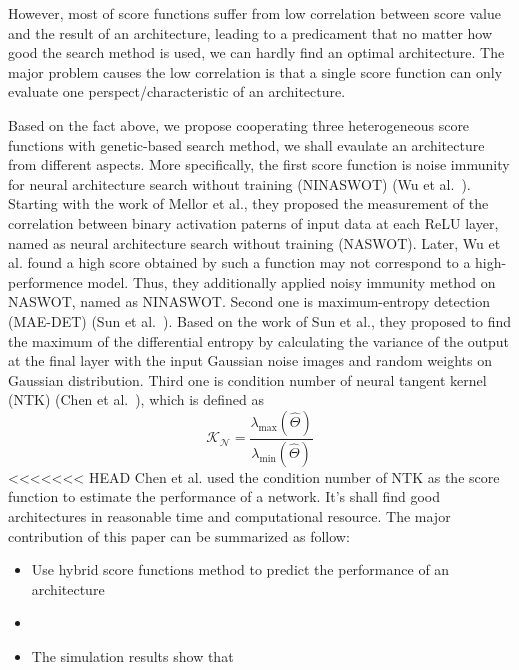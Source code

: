 \documentclass[conference]{IEEEtran}
\begin{document}
    However, most of score functions suffer from low correlation between 
    score value and the result of an architecture, leading to a predicament 
    that no matter how good the search method is used, we can hardly find 
    an optimal architecture. 
    The major problem causes the low correlation is that a single score 
    function can only evaluate one perspect/characteristic of an architecture.
    
    Based on the fact above, we propose cooperating three heterogeneous score 
    functions with genetic-based search method, we shall evaulate an architecture 
    from different aspects. More specifically, the first score function is 
    noise immunity for neural architecture search without training (NINASWOT) 
    (Wu et al.\ \cite{10.1145/3491396.3506510}). Starting with the work of Mellor 
    et al., they proposed the measurement of the correlation between binary 
    activation paterns of input data at each ReLU layer, named as neural architecture 
    search without training (NASWOT). Later, Wu et al. found a high score obtained 
    by such a function may not correspond to a high-performence model. Thus, 
    they additionally applied noisy immunity method on NASWOT, named as NINASWOT. 
    Second one is maximum-entropy detection (MAE-DET) (Sun et al.\ \cite{https://doi.org/10.48550/arxiv.2111.13336}). 
    Based on the work of Sun et al., they proposed to find the maximum of 
    the differential entropy by calculating the variance of the output at 
    the final layer with the input Gaussian noise images and random weights on 
    Gaussian distribution. Third one is condition number of neural tangent kernel 
    (NTK) (Chen et al.\ \cite{https://doi.org/10.48550/arxiv.2102.11535}), which is 
    defined as 
    \begin{equation}
        \mathcal{K_N}=\frac{\lambda_{\textrm{max}}(\hat\Theta)}{\lambda_{\textrm{min}}(\hat\Theta)}
    \end{equation}
<<<<<<< HEAD
    Chen et al. used the condition number of NTK as the score function to 
    estimate the performance of a network.
    It's shall find good architectures in reasonable time and computational 
    resource.
    The major contribution of this paper can be summarized as follow:
    \begin{itemize}
        \item Use hybrid score functions method to predict the performance 
        of an architecture
        \item 
        \item The simulation results show that 
    \end{itemize}
\end{document}

